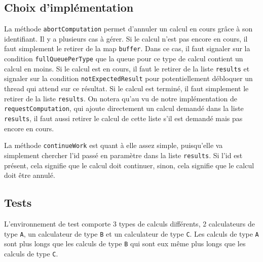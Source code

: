 \documentclass{article}
\begin{document}
\subsection{Choix d'implémentation}
La méthode \texttt{abortComputation} permet d’annuler un calcul en cours grâce à son identifiant. Il y a plusieurs
cas à gérer. Si le calcul n’est pas encore en cours, il faut simplement le retirer de la map \texttt{buffer}. Dans
ce cas, il faut signaler sur la condition \texttt{fullQueuePerType} que la queue pour ce type de calcul contient un
calcul en moins. Si le calcul est en cours, il faut le retirer de la liste \texttt{results} et signaler sur
la condition \texttt{notExpectedResult} pour potentiellement débloquer un thread qui attend sur ce résultat.
Si le calcul est terminé, il faut simplement le retirer de la liste \texttt{results}.
On notera qu'au vu de notre implémentation de \texttt{requestComputation}, qui ajoute directement un calcul demandé
dans la liste \texttt{results}, il faut aussi retirer le calcul de cette liste s'il est demandé mais pas encore en
cours.

La méthode \texttt{continueWork} est quant à elle assez simple, puisqu'elle va simplement chercher l'id passé en
paramètre dans la liste \texttt{results}. Si l'id est présent, cela signifie que le calcul doit continuer, sinon, cela
signifie que le calcul doit être annulé.

\subsection{Tests}
L'environnement de test comporte 3 types de calculs différents, 2 calculateurs de type \texttt{A}, un
calculateur de type \texttt{B} et un calculateur de type \texttt{C}. Les calculs de type \texttt{A} sont plus longs
que les calculs de type \texttt{B} qui sont eux même plus longs que les calculs de type \texttt{C}.
\end{document}
